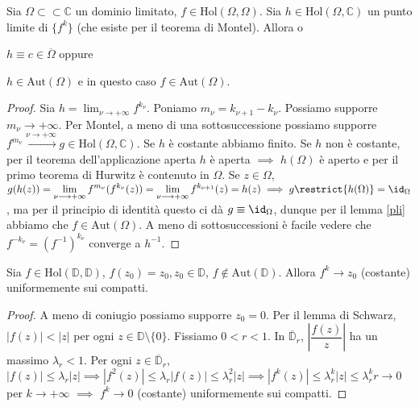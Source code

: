 \begin{prop} \label{lim_aut}
  Sia $\Omega \subset \subset \mathbb{C}$ un dominio limitato, $f \in \text{Hol}(\Omega, \Omega)$. Sia $h \in \text{Hol}(\Omega, \mathbb{C})$ un punto limite di $\{f^k\}$ (che esiste per il teorema di Montel). Allora o
  \begin{nlist}
    \item $h \equiv c \in \overline{\Omega}$ oppure
    \item $h \in \text{Aut}(\Omega)$ e in questo caso $f \in \text{Aut}(\Omega)$.
  \end{nlist}
\end{prop}

\begin{proof}
  Sia $\displaystyle h=\lim_{\nu \longrightarrow +\infty} f^{k_{\nu}}$. Poniamo $m_{\nu}=k_{\nu+1}-k_{\nu}$. Possiamo supporre $m_{\nu} \longrightarrow +\infty$. Per Montel, a meno di una sottosuccessione possiamo supporre $f^{m_{\nu}} \xrightarrow{\nu \longrightarrow +\infty} g \in \text{Hol}(\Omega, \mathbb{C})$.
  Se $h$ è costante abbiamo finito. Se $h$ non è costante, per il teorema dell'applicazione aperta $h$ è aperta $\implies$ $h(\Omega)$ è aperto e per il primo teorema di Hurwitz è contenuto in $\Omega$.
  Se $z \in \Omega$, $\displaystyle g(h(z))=\lim_{\nu \longrightarrow +\infty} f^{m_{\nu}}(f^{k_{\nu}}(z))=\lim_{\nu \longrightarrow +\infty} f^{k_{\nu+1}}(z)=h(z) \implies g\restrict{h(\Omega)}=\id_{\Omega}$,
  ma per il principio di identità questo ci dà $g \equiv \id_{\Omega}$, dunque per il lemma \ref{pli} abbiamo che $f \in \text{Aut}(\Omega)$. A meno di sottosuccessioni è facile vedere che $f^{-k_{\nu}}=(f^{-1})^{k_{\nu}}$ converge a $h^{-1}$.
\end{proof}

\begin{prop}
  Sia $f \in \text{Hol}(\mathbb{D}, \mathbb{D})$, $f(z_0)=z_0, z_0 \in \mathbb{D}$, $f\not\in \text{Aut}(\mathbb{D})$. Allora $f^k \longrightarrow z_0$ (costante) uniformemente sui compatti.
\end{prop}

\begin{proof}
  A meno di coniugio possiamo supporre $z_0=0$. Per il lemma di Schwarz, $|f(z)|<|z|$ per ogni $z \in \mathbb{D}\setminus\{0\}$. Fissiamo $0<r<1$. In $\overline{\mathbb{D}}_r$, $\left|\dfrac{f(z)}{z}\right|$ ha un massimo $\lambda_r<1$.
  Per ogni $z \in \overline{\mathbb{D}}_r$, $|f(z)| \le \lambda_r|z| \implies |f^2(z)| \le \lambda_r|f(z)| \le \lambda_r^2|z| \implies |f^k(z)| \le \lambda_r^k|z| \le \lambda_r^kr \longrightarrow 0$ per $k \longrightarrow +\infty$ $\implies$ $f^k \longrightarrow 0$ (costante) uniformemente sui compatti.
\end{proof}

